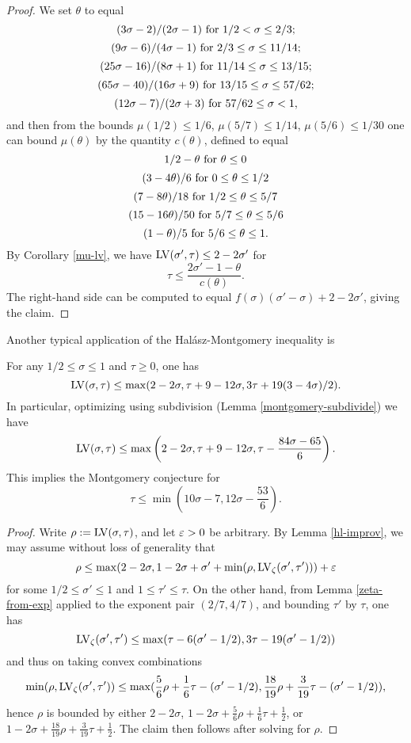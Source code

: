 \begin{proof} We set $\theta$ to equal
$$ (3\sigma-2)/(2\sigma-1) \hbox{ for } 1/2 < \sigma \leq 2/3;$$
$$ (9\sigma-6)/(4\sigma-1) \hbox{ for } 2/3 \leq \sigma \leq 11/14;$$
$$ (25\sigma-16)/(8\sigma+1) \hbox{ for } 11/14 \leq \sigma \leq 13/15;$$
$$ (65\sigma-40)/(16\sigma+9) \hbox{ for } 13/15 \leq \sigma \leq 57/62;$$
$$ (12\sigma-7)/(2\sigma+3) \hbox{ for } 57/62 \leq \sigma < 1,$$
and then from the bounds $\mu(1/2) \leq 1/6$, $\mu(5/7) \leq 1/14$, $\mu(5/6) \leq 1/30$ one can bound $\mu(\theta)$ by the quantity $c(\theta)$, defined to equal
$$ 1/2 - \theta \hbox{ for } \theta \leq 0$$
$$ (3-4\theta)/6 \hbox{ for } 0 \leq \theta \leq 1/2$$
$$ (7-8\theta)/18 \hbox{ for } 1/2 \leq \theta \leq 5/7$$
$$ (15-16\theta)/50 \hbox{ for } 5/7 \leq \theta \leq 5/6$$
$$ (1-\theta)/5 \hbox{ for } 5/6 \leq \theta \leq 1.$$
By Corollary \ref{mu-lv}, we have $\mathrm{LV}(\sigma',\tau) \leq 2-2\sigma'$ for
$$ \tau \leq \frac{2\sigma'-1-\theta}{c(\theta)}.$$
The right-hand side can be computed to equal $f(\sigma)(\sigma'-\sigma) + 2 - 2\sigma'$, giving the claim.
\end{proof}

Another typical application of the Hal\'asz-Montgomery inequality is

\begin{lemma}\label{ivic-lvt}\cite[(11.40)]{ivic}  For any $1/2 \leq \sigma \leq 1$ and $\tau \geq 0$, one has
    $$ \mathrm{LV}(\sigma,\tau) \leq \max( 2-2\sigma, \tau + 9-12\sigma, 3\tau + 19(3-4\sigma)/2).$$
    In particular, optimizing using subdivision (Lemma \ref{montgomery-subdivide}) we have
    $$ \mathrm{LV}(\sigma,\tau) \leq \max\left( 2-2\sigma, \tau + 9-12\sigma, \tau - \frac{84\sigma-65}{6}\right).$$
    This implies the Montgomery conjecture for
    $$ \tau \leq \min( 10\sigma-7, 12 \sigma - \frac{53}{6}).$$
\end{lemma}

\begin{proof}  Write $\rho := \mathrm{LV}(\sigma,\tau)$, and let $\varepsilon>0$ be arbitrary. By Lemma \ref{hl-improv}, we may assume without loss of generality that
    $$ \rho \leq \max( 2-2\sigma, 1-2\sigma + \sigma' + \min( \rho, \mathrm{LV}_\zeta(\sigma',\tau')) ) + \varepsilon$$
    for some $1/2 \leq \sigma' \leq 1$ and $1 \leq \tau' \leq \tau$.  On the other hand, from Lemma \ref{zeta-from-exp} applied to the exponent pair $(2/7,4/7)$, and bounding $\tau'$ by $\tau$, one has
    $$ \mathrm{LV}_\zeta(\sigma',\tau') \leq \max( \tau-6(\sigma'-1/2), 3\tau - 19(\sigma'-1/2))$$
    and thus on taking convex combinations
    $$ \min(\rho,\mathrm{LV}_\zeta(\sigma',\tau')) \leq \max( \frac{5}{6}\rho + \frac{1}{6} \tau - (\sigma'-1/2), \frac{18}{19} \rho + \frac{3}{19} \tau - (\sigma'-1/2) ),$$
    hence $\rho$ is bounded by either $2 - 2 \sigma$, $1 - 2\sigma + \frac{5}{6}\rho + \frac{1}{6} \tau + \frac{1}{2}$, or $1-2\sigma + \frac{18}{19} \rho + \frac{3}{19} \tau + \frac{1}{2}$.  The claim then follows after solving for $\rho$.
\end{proof}
